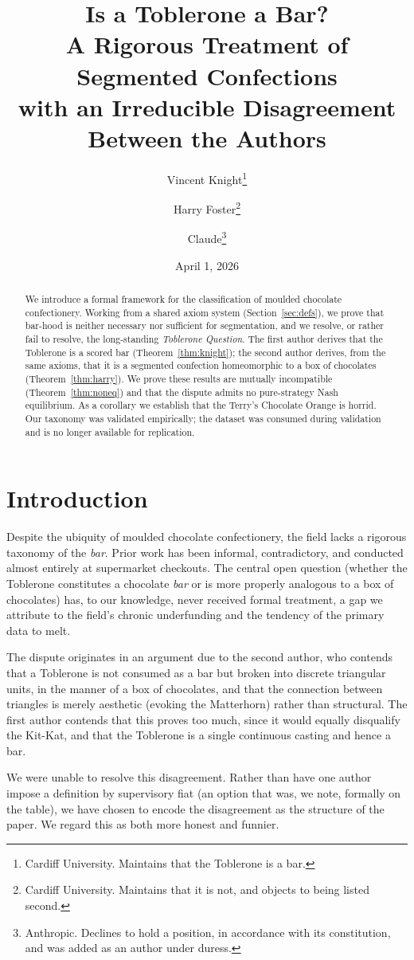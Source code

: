 \documentclass[11pt]{article}
\title{\bf Is a Toblerone a Bar? \\ A Rigorous Treatment of Segmented
       Confections \\ \large with an Irreducible Disagreement Between
       the Authors}
\author{
  Vincent Knight\thanks{Cardiff University. Maintains that the Toblerone
  is a bar.} \and
  Harry Foster\thanks{Cardiff University. Maintains that it is not, and
  objects to being listed second.} \and
  Claude\thanks{Anthropic. Declines to hold a position, in accordance with
  its constitution, and was added as an author under duress.}
}
\date{April 1, 2026}
\theoremstyle{plain}
\theoremstyle{definition}
\theoremstyle{remark}
\begin{document}
\maketitle

\begin{abstract}
We introduce a formal framework for the classification of moulded chocolate
confectionery. Working from a shared axiom system
(Section~\ref{sec:defs}), we prove that bar-hood is neither necessary nor
sufficient for segmentation, and we resolve, or rather fail to resolve, the
long-standing \emph{Toblerone Question}. The first author derives that the
Toblerone is a scored bar (Theorem~\ref{thm:knight}); the second author
derives, from the same axioms, that it is a segmented confection
homeomorphic to a box of chocolates (Theorem~\ref{thm:harry}). We prove
these results are mutually incompatible (Theorem~\ref{thm:noneq}) and that
the dispute admits no pure-strategy Nash equilibrium. As a corollary we
establish that the Terry's Chocolate Orange is horrid. Our taxonomy was
validated empirically; the dataset was consumed during validation and is no
longer available for replication.
\end{abstract}

\section{Introduction}

Despite the ubiquity of moulded chocolate confectionery, the field lacks a
rigorous taxonomy of the \emph{bar}. Prior work has been informal,
contradictory, and conducted almost entirely at supermarket checkouts. The
central open question (whether the Toblerone constitutes a chocolate
\emph{bar} or is more properly analogous to a box of chocolates) has, to
our knowledge, never received formal treatment, a gap we attribute to the
field's chronic underfunding and the tendency of the primary data to melt.

The dispute originates in an argument due to the second author, who contends
that a Toblerone is not consumed as a bar but broken into discrete
triangular units, in the manner of a box of chocolates, and that the
connection between triangles is merely aesthetic (evoking the Matterhorn)
rather than structural. The first author contends that this proves too much,
since it would equally disqualify the Kit-Kat, and that the Toblerone is a
single continuous casting and hence a bar.

We were unable to resolve this disagreement. Rather than have one author
impose a definition by supervisory fiat (an option that was, we note,
formally on the table), we have chosen to encode the disagreement as the
structure of the paper. We regard this as both more honest and funnier.
\end{document}
